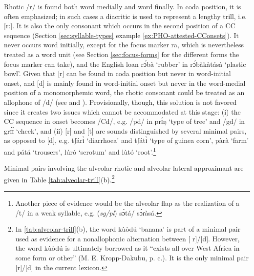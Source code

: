 Rhotic /{\sls r}/ is found both word medially and word finally. In coda 
position, 
it is often emphasized; in such cases a diacritic is used to represent a lengthy 
trill, i.e. [{\sls rː}]. It is also  the only consonant which occurs in the 
second position of a CC sequence  (Section \ref{sec:syllable-types} example 
\ref{ex:PHO-attested-CConsets}). It never occurs word initially, except for the 
focus marker {\sls ra}, which is nevertheless treated as a word unit (see 
Section 
\ref{sec:focus-forms} for the different forms the focus marker can take), and  
the English loan {\sls rɔ́bà} `rubber' in {\sls rɔ́bàkàtásà} `plastic 
bowl'. 
Given that [{\sls r}]  can be found in coda position but never in word-initial 
onset,  and [{\sls d}] is mainly found in word-initial onset but never in the 
word-medial position of a monomorphemic word, the rhotic consonant could be 
treated as an allophone of /{\sls d}/ (see  \citealt[30--31]{Awed02} and 
\citealt[62--64]{Daku02a}). Provisionally, though,  this solution is not favored 
since it creates two issues which cannot be accommodated at this stage: (i) the  
CC sequence in onset becomes /Cd/,  e.g. /{\sls pd}/ in {\sls prɪ́ŋ} `type of 
tree' and /{\sls gd}/ in {\sls grɪ́ɪ́} `cheek',  and (ii)  [{\sls r}] and 
[{\sls t}] 
are sounds distinguished by several minimal pairs, as opposed to [{\sls d}], 
e.g. 
 {\sls tʃárɪ̀} `diarrhoea' and  {\sls tʃátɪ̀} `type of guinea corn', {\sls 
pàrà} 
`farm' and  {\sls pátá} `trousers',  {\sls lúró} `scrotum' and  {\sls lùtó} 
`root'.\footnote{Another piece of evidence would be the alveolar flap as the 
realization of a {\sls/t/} in a weak syllable, e.g.  ({\it sg/pl}) {\sls 
sɔ̀tá}/{\sls 
sɔ̀ɾàsá}.}

Minimal pairs involving the alveolar rhotic and alveolar lateral approximant are 
given in Table \ref{tab:alveolar-trill}(b).\footnote{In 
\ref{tab:alveolar-trill}(b), the word {\sls kùòdú} `banana' is part of a 
minimal pair used as evidence for a  nonallophonic alternation between [{\sls 
r}]/[{\sls d}]. However, the word {\sls kùòdú} is ultimately borrowed as it 
``exists all over West Africa in some form or other''  (M. E. Kropp-Dakubu, p. 
c.). It is the only minimal pair  [{\sls r}]/[{\sls d}] in the current lexicon.}



